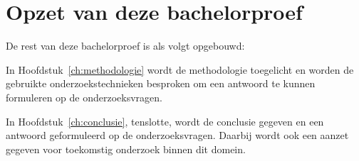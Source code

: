 \section{Opzet van deze bachelorproef}
\label{sec:opzet-bachelorproef}


De rest van deze bachelorproef is als volgt opgebouwd:

In Hoofdstuk~\ref{ch:methodologie} wordt de methodologie toegelicht en worden de gebruikte onderzoekstechnieken besproken om een antwoord te kunnen formuleren op de onderzoeksvragen.


In Hoofdstuk~\ref{ch:conclusie}, tenslotte, wordt de conclusie gegeven en een antwoord geformuleerd op de onderzoeksvragen. Daarbij wordt ook een aanzet gegeven voor toekomstig onderzoek binnen dit domein.

